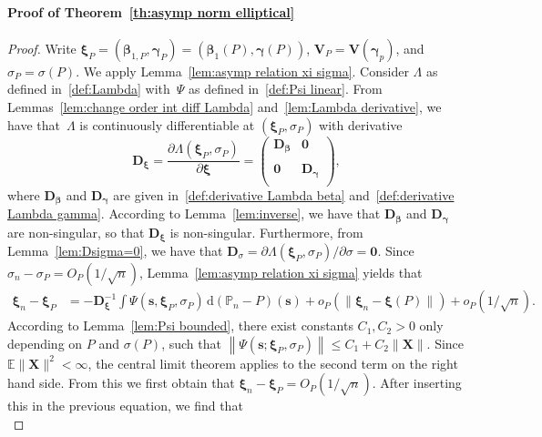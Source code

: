 \documentclass{article}
\numberwithin{equation}{section}
\theoremstyle{plain}
\newcommand{\dd}{\mathrm{d}}
\newcommand{\bbeta}{\bm\beta}
\newcommand{\bxi}{\bm\xi}
\newcommand{\bgamma}{\bm\gamma}
\newcommand{\bs}{\mathbf{s}}
\newcommand{\bX}{\mathbf{X}}
\newcommand{\bV}{\mathbf{V}}
\newcommand{\bD}{\mathbf{D}}
\newcommand{\E}{\mathbb{E}}
\begin{document}
\paragraph*{Proof of Theorem~\ref{th:asymp norm elliptical}}
\begin{proof}
Write $\bxi_P=(\bbeta_{1,P},\bgamma_P)=(\bbeta_1(P),\bgamma(P))$,
$\bV_P=\bV(\bgamma_p)$, and $\sigma_P=\sigma(P)$.
We apply Lemma~\ref{lem:asymp relation xi sigma}.
Consider $\Lambda$ as defined in~\eqref{def:Lambda} with~$\Psi$ as defined in~\eqref{def:Psi linear}.
From Lemmas~\ref{lem:change order int diff Lambda} and~\ref{lem:Lambda derivative},
we have that~$\Lambda$ is continuously differentiable at $(\bxi_P,\sigma_P)$ 
with derivative
\[
\bD_{\bxi}
=
\frac{\partial \Lambda(\bxi_P,\sigma_P)}{\partial \bxi}
=
\left(
  \begin{array}{cc}
\bD_{\bbeta} & \mathbf{0}\\
    \\
\mathbf{0} & \bD_{\bgamma} \\
  \end{array}
\right),
\]
where $\bD_{\bbeta}$ and $\bD_{\bgamma}$ are given in~\eqref{def:derivative Lambda beta} and~\eqref{def:derivative Lambda gamma}.
According to Lemma~\ref{lem:inverse}, we have that 
$\bD_{\bbeta}$ and $\bD_{\bgamma}$ are non-singular, so that $\bD_{\bxi}$ is non-singular.
Furthermore, from Lemma~\ref{lem:Dsigma=0}, we have that 
$\bD_{\sigma}=\partial\Lambda(\bxi_P,\sigma_P)/\partial\sigma=\mathbf{0}$.
Since $\sigma_n-\sigma_P=O_P(1/\sqrt{n})$, 
Lemma~\ref{lem:asymp relation xi sigma} yields that
\[
\begin{split}
\bxi_n-\bxi_P
&=
-\bD_{\bxi}^{-1}
\int 
\Psi(\mathbf{s},\bxi_P,\sigma_P)\,\dd (\mathbb{P}_n-P)(\mathbf{s})
+
o_P(\|\bxi_n-\bxi(P)\|)
+
o_P(1/\sqrt{n}).
\end{split}
\]
According to Lemma~\ref{lem:Psi bounded}, there exist constants $C_1,C_2>0$ only depending on $P$ and $\sigma(P)$, such that
$\left\|
\Psi(\bs;\bxi_P,\sigma_P)
\right\|
\leq
C_1+C_2\|\bX\|$.
Since $\E\|\bX\|^2<\infty$, the central limit theorem applies to the second term on the right hand side.
From this we first obtain that $\bxi_n-\bxi_P=O_P(1/\sqrt{n})$.
After inserting this in the previous equation, we find that
\begin{equation}

\end{equation}
\end{proof}
\end{document}
